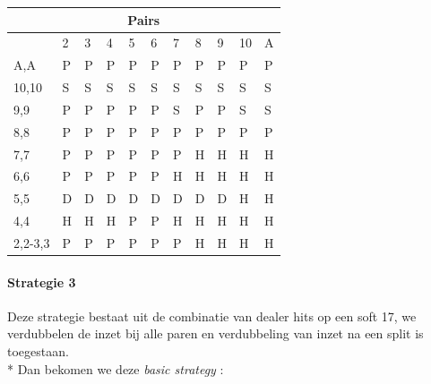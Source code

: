 \documentclass[conference]{IEEEtran}
\begin{document}
\begin{table}[ht]
\begin{tabular}{|l|l|l|l|l|l|l|l|l|l|l|}
\multicolumn{11}{|c|}{\textbf{Pairs}}                                 \\ \hline
                             & 2 & 3 & 4 & 5 & 6 & 7 & 8 & 9 & 10 & A \\ \hline
A,A                          & P & P & P & P & P & P & P & P & P & P  \\ \hline
10,10                        & S & S & S & S & S & S & S & S & S & S  \\ \hline
9,9                          & P & P & P & P & P & S & P & P & S & S  \\ \hline
8,8                          & P & P & P & P & P & P & P & P & P & P  \\ \hline
7,7                          & P & P & P & P & P & P & H & H & H & H  \\ \hline
6,6                          & P & P & P & P & P & H & H & H & H & H  \\ \hline
5,5                          & D & D & D & D & D & D & D & D & H & H  \\ \hline
4,4                          & H & H & H & P & P & H & H & H & H & H  \\ \hline
2,2-3,3                      & P & P & P & P & P & P & H & H & H & H  \\ \hline
\end{tabular}
\end{table}



\paragraph{Strategie 3}

Deze strategie bestaat uit de combinatie van dealer hits op een soft 17, we verdubbelen de inzet bij alle paren en verdubbeling van inzet na een split is toegestaan.\\*
Dan bekomen we deze \textit{basic strategy} :
\end{document}
